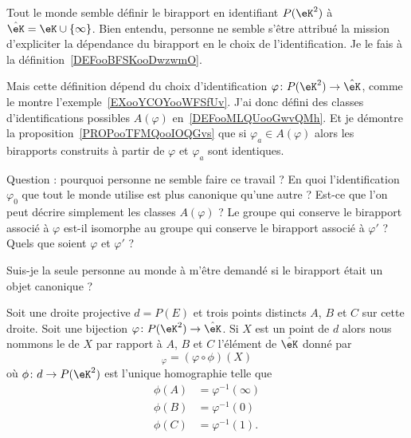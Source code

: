 \begin{normaltext}
	Tout le monde semble définir le birapport en identifiant \( P(\eK^2)\) à \( \hat\eK=\eK\cup\{ \infty \}\). Bien entendu, personne ne semble s'être attribué la mission d'expliciter la dépendance du birapport en le choix de l'identification. Je le fais à la définition~\ref{DEFooBFSKooDwzwmO}.

	Mais cette définition dépend du choix d'identification \( \varphi\colon P(\eK^2)\to \hat\eK\), comme le montre l'exemple~\ref{EXooYCOYooWFSfUv}. J'ai donc défini des classes d'identifications possibles \( A(\varphi)\) en~\ref{DEFooMLQUooGwvQMh}. Et je démontre la proposition~\ref{PROPooTFMQooIOQGvs} que si \( \varphi_a\in A(\varphi)\) alors les birapports construits à partir de \( \varphi\) et \( \varphi_a\) sont identiques.

	Question : pourquoi personne ne semble faire ce travail ? En quoi l'identification \( \varphi_0\) que tout le monde utilise est plus canonique qu'une autre ? Est-ce que l'on peut décrire simplement les classes \( A(\varphi)\) ? Le groupe qui conserve le birapport associé à \( \varphi\) est-il isomorphe au groupe qui conserve le birapport associé à \( \varphi'\) ? Quels que soient \( \varphi\) et \( \varphi'\) ?

	Suis-je la seule personne au monde à m'être demandé si le birapport était un objet canonique ?
\end{normaltext}

\begin{propositionDef}      \label{DEFooBFSKooDwzwmO}
	Soit une droite projective \( d=P(E)\) et trois points distincts \( A\), \( B\) et \( C\) sur cette droite. Soit une bijection \( \varphi\colon P(\eK^2)\to \hat\eK\). Si \( X\) est un point de \( d\) alors nous nommons le  de \( X\) par rapport à \( A\), \( B\) et \( C\) l'élément de \( \hat\eK\) donné par
	\begin{equation}
		[A,B,C,X]_{\varphi}=(\varphi\circ\phi)(X)
	\end{equation}
	où \( \phi\colon d\to P(\eK^2) \) est l'unique homographie telle que
	\begin{subequations}        \label{SUBEQooYWMSooYlFKQv}
		\begin{align}
			\phi(A) & =\varphi^{-1}(\infty) \\
			\phi(B) & =\varphi^{-1}(0)      \\
			\phi(C) & =\varphi^{-1}(1).
		\end{align}
	\end{subequations}
\end{propositionDef}

